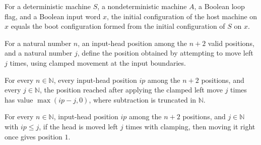 \begin{theorem}
\label{Turing.ClockHost.initCfg_eq_bootCfg}
\leanok
{}
For a deterministic machine $S$, a nondeterministic machine $A$, a Boolean loop flag,
and a Boolean input word $x$, the initial configuration of the host machine on $x$
equals the boot configuration formed from the initial configuration of $S$ on $x$.
\end{theorem}

\begin{definition}
\label{Turing.ClockHost.inLeft}
\leanok
{}
For a natural number $n$, an input-head position among the $n+2$ valid positions, and a
natural number $j$, define the position obtained by attempting to move left $j$ times,
using clamped movement at the input boundaries.
\end{definition}

\begin{theorem}
\label{Turing.ClockHost.inLeft_val}
\leanok
{}
For every $n\in\mathbb N$, every input-head position $ip$ among the $n+2$ positions, and
every $j\in\mathbb N$, the position reached after applying the clamped left move $j$
times has value $\max(ip- j,0)$, where subtraction is truncated in $\mathbb N$.
\end{theorem}

\begin{theorem}
\label{Turing.ClockHost.moveInputPos_inLeft}
\leanok
{}
For every $n\in\mathbb N$, input-head position $ip$ among the $n+2$ positions, and
$j\in\mathbb N$ with $ip\le j$, if the head is moved left $j$ times with clamping, then
moving it right once gives position $1$.
\end{theorem}

